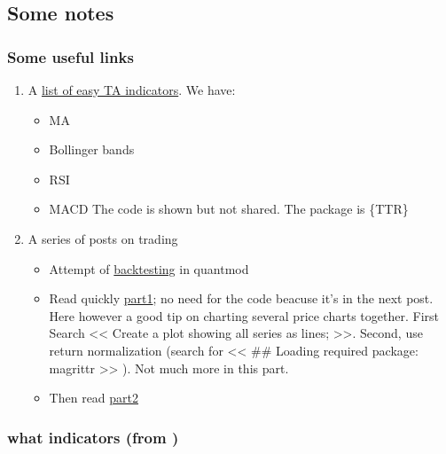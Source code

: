 \documentclass[
  11pt,
]{article}
\providecommand{\tightlist}{%
  \setlength{\itemsep}{0pt}\setlength{\parskip}{0pt}}
\begin{document}
\hypertarget{some-notes}{%
\subsection{Some notes}\label{some-notes}}

\hypertarget{some-useful-links}{%
\subsubsection{Some useful links}\label{some-useful-links}}

\begin{enumerate}
\def\labelenumi{\arabic{enumi}.}
\tightlist
\item
  A
  \href{http://www.tradinggeeks.net/2014/07/technical-analysis-with-r/}{list
  of easy TA indicators}. We have:

  \begin{itemize}
  \tightlist
  \item
    MA
  \item
    Bollinger bands
  \item
    RSI
  \item
    MACD The code is shown but not shared. The package is \{TTR\}
  \end{itemize}
\item
  A series of posts on trading

  \begin{itemize}
  \tightlist
  \item
    Attempt of
    \href{https://quantstrattrader.wordpress.com/category/portfolio-management/}{backtesting}
    in quantmod
  \item
    Read quickly
    \href{https://ntguardian.wordpress.com/2017/03/27/introduction-stock-market-data-r-1/}{part1};
    no need for the code beacuse it's in the next post. Here however a
    good tip on charting several price charts together. First Search
    \textless\textless{} Create a plot showing all series as lines;
    \textgreater\textgreater. Second, use return normalization (search
    for \textless\textless{} \#\# Loading required package: magrittr
    \textgreater\textgreater{} ). Not much more in this part.
  \item
    Then read
    \href{https://ntguardian.wordpress.com/2017/04/03/introduction-stock-market-data-r-2/}{part2}
  \end{itemize}
\end{enumerate}

\hypertarget{what-indicators-from-neftci1991}{%
\subsubsection{\texorpdfstring{what indicators (from
\citet{Neftci1991})}{what indicators (from @Neftci1991)}}\label{what-indicators-from-neftci1991}}
\end{document}
